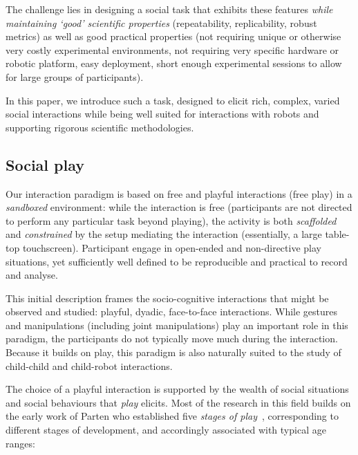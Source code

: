 \documentclass[sigconf]{acmart}
\begin{document}
The challenge lies in designing a social task that exhibits these features
\emph{while maintaining `good' scientific properties} (repeatability, replicability,
robust metrics) as well as good practical properties (not requiring unique or
otherwise very costly experimental environments, not requiring very specific
hardware or robotic platform, easy deployment, short enough experimental
sessions to allow for large groups of participants).

In this paper, we introduce such a task, designed to elicit rich, complex, varied
social interactions while being well suited for interactions with robots and
supporting rigorous scientific methodologies.

\subsection{Social play}

Our interaction paradigm is based on free and playful interactions (free play)
in a \emph{sandboxed} environment: while the interaction is free (participants
are not directed to perform any particular task beyond playing), the activity is
both \emph{scaffolded} and \emph{constrained} by the setup mediating the
interaction (essentially, a large table-top touchscreen).
Participant engage in open-ended and non-directive play situations, yet sufficiently
well defined to be reproducible and practical to record and analyse.

This initial description frames the socio-cognitive interactions that might be
observed and studied: playful, dyadic, face-to-face interactions. While gestures
and manipulations (including joint manipulations) play an important role in this
paradigm, the participants do not typically move much during the interaction.
Because it builds on play, this paradigm is also naturally suited to the study
of child-child and child-robot interactions.

The choice of a playful interaction is supported by the wealth of social
situations and social behaviours that \emph{play} elicits. Most of the research
in this field builds on the early work of Parten who established five
\emph{stages of play}~\cite{parten1932social}, corresponding to different stages
of development, and accordingly associated with typical age ranges:
\end{document}
